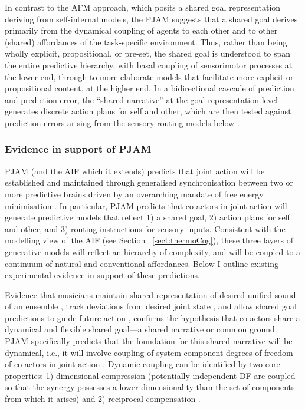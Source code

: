 \begin{CJK}{UTF8}{gbsn}
In contrast to the AFM approach, which posits a shared goal representation deriving from self-internal models, the PJAM suggests that a shared goal derives primarily from the dynamical coupling of agents to each other and to other (shared) affordances of the task-specific environment.  Thus, rather than being wholly explicit, propositional, or pre-set, the shared goal is understood to span the entire predictive hierarchy, with basal coupling of sensorimotor processes at the lower end, through to more elaborate models that facilitate more explicit or propositional content, at the higher end.  In a bidirectional cascade of prediction and prediction error, the ``shared narrative'' at the goal representation level generates discrete action plans for self and other, which are then tested against prediction errors arising from the sensory routing models below \citep{Pesquita2017}.


\subsubsection{Evidence in support of PJAM}
PJAM (and the AIF which it extends) predicts that joint action will be established and maintained through generalised synchronisation between two or more predictive brains driven by an overarching mandate of free energy minimisation \citep{Friston2015}.  In particular, PJAM predicts that co-actors in joint action will generate predictive models that reflect 1) a shared goal, 2) action plans for self and other, and 3) routing instructions for sensory inputs.  Consistent with the modelling view of the AIF (see Section ~\ref{sect:thermoCog}), these three layers of generative models will reflect an hierarchy of complexity, and will be coupled to a continuum of natural and conventional affordances.  Below I outline existing experimental evidence in support of these predictions.

Evidence that musicians maintain shared representation of desired unified sound of an ensemble \citep{Keller2008}, track deviations from desired joint state \citep{Loehr2013}, and allow shared goal predictions to guide future action \citep{Loehr2016}, confirms the hypothesis that co-actors share a dynamical and flexible shared goal---a shared narrative or common ground.  PJAM specifically predicts that the foundation for this shared narrative will be dynamical, i.e., it will involve coupling of system component degrees of freedom of co-actors in joint action \citep{Turvey1978,Schmidt1990}. Dynamic coupling can be identified by two core properties:  1) dimensional compression (potentially independent DF are coupled so that the synergy possesses a lower dimensionality than the set of components from which it arises) and 2) reciprocal compensation \citep[the ability of one component of a synergy to react to changes in others][]{Riley2011}.


\end{CJK}
